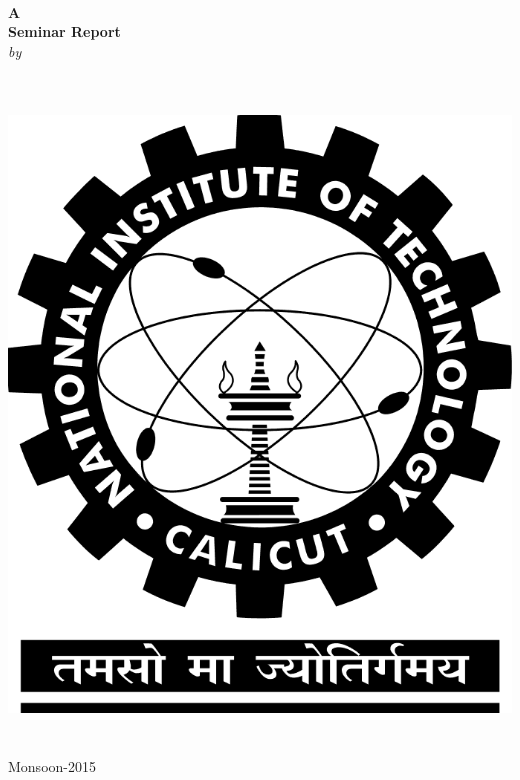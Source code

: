 \begin{titlepage}
\vspace*{0.7cm}
\centering

\large

{\Large \textbf{\myTopic{}}}\\[2cm]

\textbf{A\\
	Seminar Report}\\[0.35cm]

\textit{by}\\[0.5cm]

\textrm{\textbf{\myName{}\\
		\myRollNo{}}}\\[1cm]

\vfill

\includegraphics[scale=0.2]{./nitc-logo.png}\\[1cm]

\myDeptName{}\\
\myCollegeName{}\\

{\Large Monsoon-2015}

\end{titlepage}
